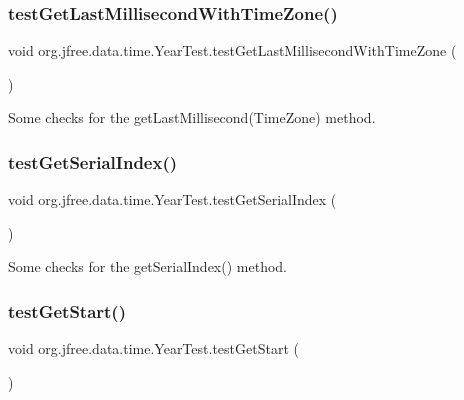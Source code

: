\subsubsection{\texorpdfstring{test\+Get\+Last\+Millisecond\+With\+Time\+Zone()}{testGetLastMillisecondWithTimeZone()}}
{\footnotesize\ttfamily void org.\+jfree.\+data.\+time.\+Year\+Test.\+test\+Get\+Last\+Millisecond\+With\+Time\+Zone (\begin{DoxyParamCaption}{ }\end{DoxyParamCaption})}

Some checks for the get\+Last\+Millisecond(\+Time\+Zone) method. \mbox{\label{classorg_1_1jfree_1_1data_1_1time_1_1_year_test_acf4fef53587b9868eabad80eaf5004c4}} 
\subsubsection{\texorpdfstring{test\+Get\+Serial\+Index()}{testGetSerialIndex()}}
{\footnotesize\ttfamily void org.\+jfree.\+data.\+time.\+Year\+Test.\+test\+Get\+Serial\+Index (\begin{DoxyParamCaption}{ }\end{DoxyParamCaption})}

Some checks for the get\+Serial\+Index() method. \mbox{\label{classorg_1_1jfree_1_1data_1_1time_1_1_year_test_a5caf163a2c262792c9b43cbf1db77b88}} 
\subsubsection{\texorpdfstring{test\+Get\+Start()}{testGetStart()}}
{\footnotesize\ttfamily void org.\+jfree.\+data.\+time.\+Year\+Test.\+test\+Get\+Start (\begin{DoxyParamCaption}{ }\end{DoxyParamCaption})}


